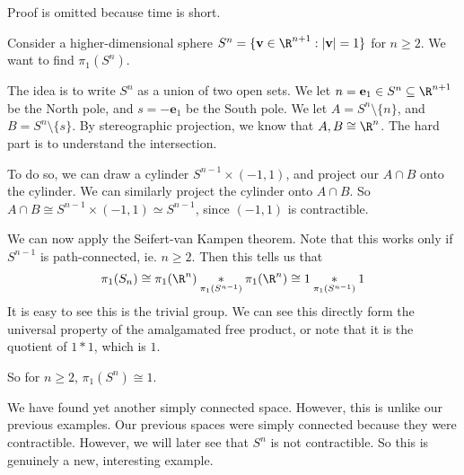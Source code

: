 \documentclass[a4paper]{article}
\begin{document}
Proof is omitted because time is short. %

\begin{eg}
  Consider a higher-dimensional sphere $S^n = \{\mathbf{v} \in \R^{n + 1}: |\mathbf{v}| = 1\}$ for $n \geq 2$. We want to find $\pi_1(S^n)$.

  The idea is to write $S^n$ as a union of two open sets. We let $n = \mathbf{e}_1 \in S^n \subseteq \R^{n + 1}$ be the North pole, and $s = -\mathbf{e}_1$ be the South pole. We let $A = S^n \setminus \{n\}$, and $B = S^n \setminus\{s\}$. By stereographic projection, we know that $A, B \cong \R^n$. The hard part is to understand the intersection.

  To do so, we can draw a cylinder $S^{n - 1} \times (-1, 1)$, and project our $A\cap B$ onto the cylinder. We can similarly project the cylinder onto $A\cap B$. So $A\cap B\cong S^{n - 1} \times (-1, 1) \simeq S^{n - 1}$, since $(-1, 1)$ is contractible.
  \begin{center}
  \end{center}
  We can now apply the Seifert-van Kampen theorem. Note that this works only if $S^{n - 1}$ is path-connected, ie. $n \geq 2$. Then this tells us that
  \[
    \pi_1(S_n) \cong \pi_1(\R^n) \underset{\pi_1(S^{n - 1})}{*} \pi_1(\R^n) \cong 1 \underset{\pi_1(S^{n - 1})}{*} 1
  \]
  It is easy to see this is the trivial group. We can see this directly form the universal property of the amalgamated free product, or note that it is the quotient of $1 * 1$, which is $1$.

  So for $n \geq 2$, $\pi_1(S^n) \cong 1$.
\end{eg}
We have found yet another simply connected space. However, this is unlike our previous examples. Our previous spaces were simply connected because they were contractible. However, we will later see that $S^n$ is not contractible. So this is genuinely a new, interesting example.
\end{document}
